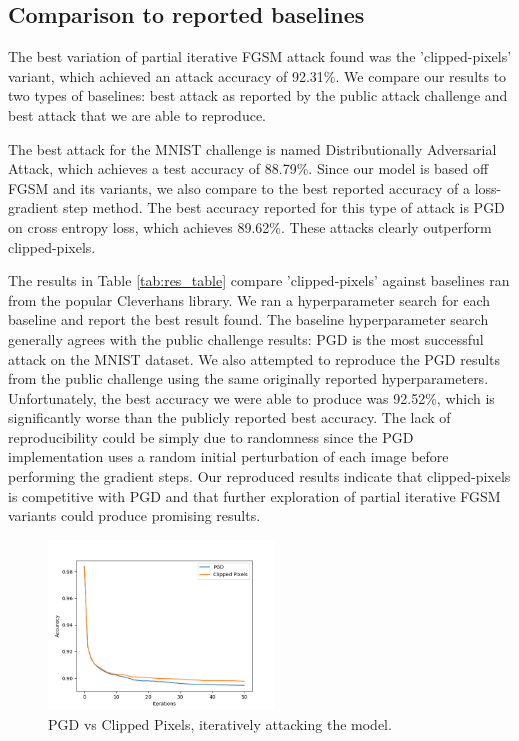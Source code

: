 \subsection{Comparison to reported baselines}
The best variation of partial iterative FGSM attack found was the 'clipped-pixels' variant, which achieved an attack accuracy of 92.31\%. We compare our results to two types of baselines: best attack as reported by the public attack challenge and best attack that we are able to reproduce.

The best attack for the MNIST challenge is named Distributionally Adversarial Attack, which achieves a test accuracy of 88.79\%. Since our model is based off FGSM and its variants, we also compare to the best reported accuracy of a loss-gradient step method. The best accuracy reported for this type of attack is PGD on cross entropy loss, which achieves 89.62\%. These attacks clearly outperform clipped-pixels.

The results in Table \ref{tab:res_table} compare 'clipped-pixels' against baselines ran from the popular Cleverhans library. We ran a hyperparameter search for each baseline and report the best result found. The baseline hyperparameter search generally agrees with the public challenge results: PGD is the most successful attack on the MNIST dataset. We also attempted to reproduce the PGD results from the public challenge using the same originally reported hyperparameters. Unfortunately, the best accuracy we were able to produce was 92.52\%, which is significantly worse than the publicly reported best accuracy. The lack of reproducibility could be simply due to randomness since the PGD implementation uses a random initial perturbation of each image before performing the gradient steps. Our reproduced results indicate that clipped-pixels is competitive with PGD and that further exploration of partial iterative FGSM variants could produce promising results.

\begin{figure}
    \centering
    \includegraphics[width=6cm]{Report/sections/images/PGD_CLIP_trainingplot.png}
    \caption{PGD vs Clipped Pixels, iteratively attacking the model.}
    \label{fig:PGDvCLIP}
\end{figure}

